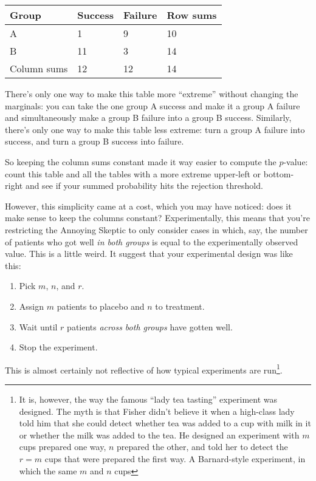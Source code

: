 \documentclass{book}
\providecommand{\tightlist}{%
  \setlength{\itemsep}{0pt}\setlength{\parskip}{0pt}}
\begin{document}
\begin{longtable}[]{@{}llll@{}}
\toprule
Group & Success & Failure & Row sums\tabularnewline
\midrule
\endhead
A & 1 & 9 & 10\tabularnewline
B & 11 & 3 & 14\tabularnewline
Column sums & 12 & 12 & 14\tabularnewline
\bottomrule
\end{longtable}

There's only one way to make this table more ``extreme'' without
changing the marginals: you can take the one group A success and make it
a group A failure and simultaneously make a group B failure into a group
B success. Similarly, there's only one way to make this table less
extreme: turn a group A failure into success, and turn a group B success
into failure.

So keeping the column sums constant made it way easier to compute the
\(p\)-value: count this table and all the tables with a more extreme
upper-left or bottom-right and see if your summed probability hits the
rejection threshold.

However, this simplicity came at a cost, which you may have noticed:
does it make sense to keep the columns constant? Experimentally, this
means that you're restricting the Annoying Skeptic to only consider
cases in which, say, the number of patients who got well \emph{in both
groups} is equal to the experimentally observed value. This is a little
weird. It suggest that your experimental design was like this:

\begin{enumerate}
\def\labelenumi{\arabic{enumi}.}
\tightlist
\item
  Pick \(m\), \(n\), and \(r\).
\item
  Assign \(m\) patients to placebo and \(n\) to treatment.
\item
  Wait until \(r\) patients \emph{across both groups} have gotten well.
\item
  Stop the experiment.
\end{enumerate}

This is almost certainly not reflective of how typical experiments are
run\footnote{It is, however, the way the famous ``lady tea tasting''
  experiment was designed. The myth is that Fisher didn't believe it
  when a high-class lady told him that she could detect whether tea was
  added to a cup with milk in it or whether the milk was added to the
  tea. He designed an experiment with \(m\) cups prepared one way, \(n\)
  prepared the other, and told her to detect the \(r = m\) cups that
  were prepared the first way. A Barnard-style experiment, in which the
  same \(m\) and \(n\) cups}.
\end{document}

